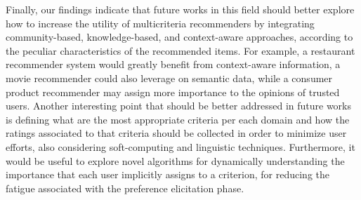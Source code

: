 Finally, our findings indicate that future works in this field should better explore how to increase the utility of multicriteria recommenders by integrating community-based, knowledge-based, and context-aware approaches, according to the peculiar characteristics of the recommended items. For example, a restaurant recommender system would greatly benefit from context-aware information, a movie recommender could also leverage on semantic data, while a consumer product recommender may assign more importance to the opinions of trusted users. Another interesting point that should be better addressed in future works is defining what are the most appropriate criteria per each domain and how the ratings associated to that criteria should be collected in order to minimize user efforts, also considering soft-computing and linguistic techniques. Furthermore, it would be useful to explore novel algorithms for dynamically understanding the importance that each user implicitly assigns to a criterion, for reducing the fatigue associated with the preference elicitation phase.
